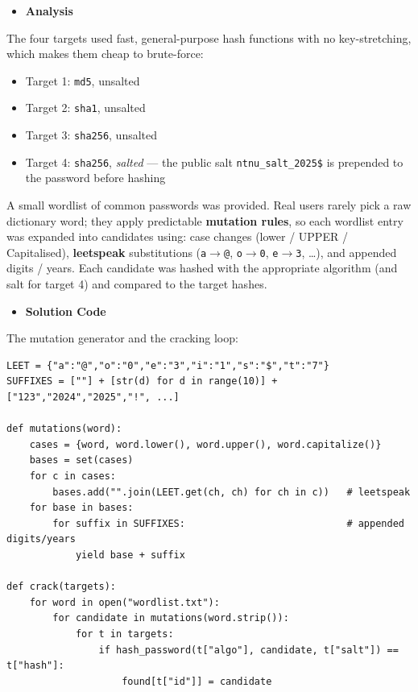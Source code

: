 \documentclass[11pt]{article}
\begin{document}
\begin{itemize}[leftmargin=1.5em]
    \item \textbf{Analysis}
\end{itemize}
\noindent The four targets used fast, general-purpose hash functions with no key-stretching, which makes them cheap to brute-force:
\begin{itemize}[leftmargin=2.2em]
    \item Target 1: \texttt{md5}, unsalted
    \item Target 2: \texttt{sha1}, unsalted
    \item Target 3: \texttt{sha256}, unsalted
    \item Target 4: \texttt{sha256}, \emph{salted} --- the public salt \texttt{ntnu\_salt\_2025\$} is prepended to the password before hashing
\end{itemize}
\noindent A small wordlist of common passwords was provided. Real users rarely pick a raw dictionary word; they apply predictable \textbf{mutation rules}, so each wordlist entry was expanded into candidates using: case changes (lower / UPPER / Capitalised), \textbf{leetspeak} substitutions (\texttt{a$\rightarrow$@}, \texttt{o$\rightarrow$0}, \texttt{e$\rightarrow$3}, \ldots), and appended digits / years. Each candidate was hashed with the appropriate algorithm (and salt for target 4) and compared to the target hashes.

\begin{itemize}[leftmargin=1.5em]
    \item \textbf{Solution Code}
\end{itemize}
\noindent The mutation generator and the cracking loop:

\begin{footnotesize}
\begin{verbatim}
LEET = {"a":"@","o":"0","e":"3","i":"1","s":"$","t":"7"}
SUFFIXES = [""] + [str(d) for d in range(10)] + ["123","2024","2025","!", ...]

def mutations(word):
    cases = {word, word.lower(), word.upper(), word.capitalize()}
    bases = set(cases)
    for c in cases:
        bases.add("".join(LEET.get(ch, ch) for ch in c))   # leetspeak
    for base in bases:
        for suffix in SUFFIXES:                            # appended digits/years
            yield base + suffix

def crack(targets):
    for word in open("wordlist.txt"):
        for candidate in mutations(word.strip()):
            for t in targets:
                if hash_password(t["algo"], candidate, t["salt"]) == t["hash"]:
                    found[t["id"]] = candidate
\end{verbatim}
\end{footnotesize}
\end{document}
